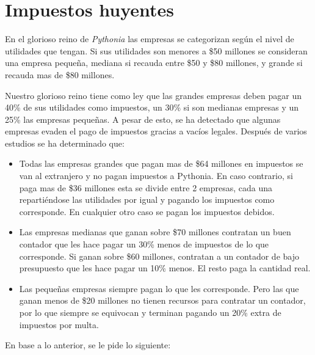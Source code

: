 \section{Impuestos huyentes}

En el glorioso reino de \textit{Pythonia} las empresas se categorizan según el nivel de utilidades que tengan. Si sus utilidades son menores a \$50 millones se consideran una empresa pequeña, mediana si recauda entre \$50 y \$80 millones, y grande si recauda mas de \$80 millones.

Nuestro glorioso reino tiene como ley que las grandes empresas deben pagar un 40\% de sus utilidades como impuestos, un 30\% si son medianas empresas y un 25\% las empresas pequeñas. A pesar de esto, se ha detectado que algunas empresas evaden el pago de impuestos gracias a vacíos legales. Después de varios estudios se ha determinado que:

\begin{itemize}
    \item Todas las empresas grandes que pagan mas de \$64 millones en impuestos se van al extranjero y no pagan impuestos a Pythonia. En caso contrario, si paga mas de \$36 millones esta se divide entre 2 empresas, cada una repartiéndose las utilidades por igual y pagando los impuestos como corresponde. En cualquier otro caso se pagan los impuestos debidos.
    \item Las empresas medianas que ganan sobre \$70 millones contratan un buen contador que les hace pagar un 30\% menos de impuestos de lo que corresponde. Si ganan sobre \$60 millones, contratan a un contador de bajo presupuesto que les hace pagar un 10\% menos. El resto paga la cantidad real.
    \item Las pequeñas empresas siempre pagan lo que les corresponde. Pero las que ganan menos de \$20 millones no tienen recursos para contratar un contador, por lo que siempre se equivocan y terminan pagando un 20\% extra de impuestos por multa.
\end{itemize}

En base a lo anterior, se le pide lo siguiente:

